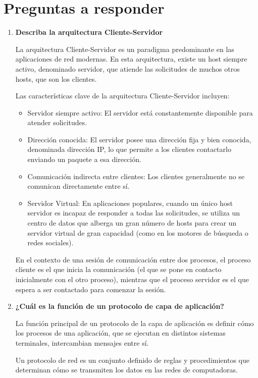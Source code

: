 \section{Preguntas a responder}
\begin{enumerate}
    \item \textbf{Describa la arquitectura Cliente-Servidor}

    La arquitectura Cliente-Servidor es un paradigma predominante en las aplicaciones de red modernas. En esta arquitectura, existe un host siempre activo, denominado servidor, que atiende las solicitudes de muchos otros hosts, que son los clientes.

    Las características clave de la arquitectura Cliente-Servidor incluyen:
    \begin{itemize}
        \item Servidor siempre activo: El servidor está constantemente disponible para atender solicitudes.
        \item Dirección conocida: El servidor posee una dirección fija y bien conocida, denominada dirección IP, lo que permite a los clientes contactarlo enviando un paquete a esa dirección.
        \item Comunicación indirecta entre clientes: Los clientes generalmente no se comunican directamente entre sí.
        \item Servidor Virtual: En aplicaciones populares, cuando un único host servidor es incapaz de responder a todas las solicitudes, se utiliza un centro de datos que alberga un gran número de hosts para crear un servidor virtual de gran capacidad (como en los motores de búsqueda o redes sociales).
    \end{itemize}

    En el contexto de una sesión de comunicación entre dos procesos, el proceso cliente es el que inicia la comunicación (el que se pone en contacto inicialmente con el otro proceso), mientras que el proceso servidor es el que espera a ser contactado para comenzar la sesión.
    
    \item \textbf{¿Cuál es la función de un protocolo de capa de aplicación?}

    La función principal de un protocolo de la capa de aplicación es definir cómo los procesos de una aplicación, que se ejecutan en distintos sistemas terminales, intercambian mensajes entre sí.

    Un protocolo de red es un conjunto definido de reglas y procedimientos que determinan cómo se transmiten los datos en las redes de computadoras.
    

\end{enumerate}
